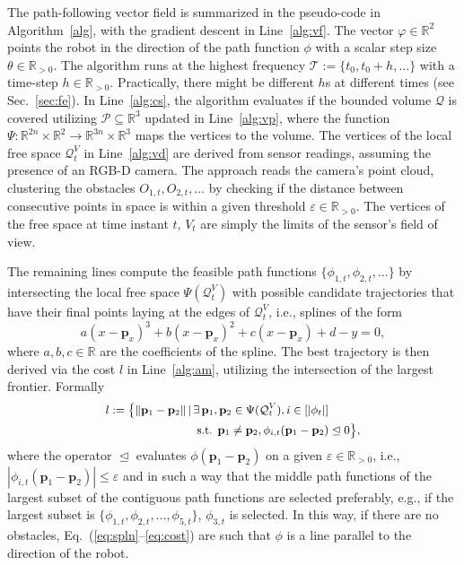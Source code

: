 \documentclass[letterpaper,10pt,conference,twoside]{IEEEtran}
\theoremstyle{definition}
\begin{document}
The path-following vector field is summarized in the pseudo-code in Algorithm~\ref{alg}, with the gradient descent in Line~\ref{alg:vf}. The vector $\varphi\in\mathbb{R}^2$ points the robot in the direction of the path function $\phi$ with a scalar step size $\theta\in\mathbb{R}_{>0}$. The algorithm runs at the highest frequency $\mathcal{T}:=\{t_0,t_0+h,\dots\}$ with a time-step $h\in\mathbb{R}_{>0}$. Practically, there might be different $h$s at different times (see Sec.~\ref{sec:fe}). In Line~\ref{alg:cs}, the algorithm evaluates if the bounded volume $\mathcal{Q}$ is covered utilizing $\mathcal{P}\subseteq\mathbb{R}^3$ updated in Line~\ref{alg:vp}, where the function $\Psi:\mathbb{R}^{2n}\times\mathbb{R}^2\rightarrow\mathbb{R}^{3n}\times\mathbb{R}^3$ maps the vertices to the volume. The vertices of the local free space $\mathcal{Q}^V_t$ in Line~\ref{alg:vd} are derived from sensor readings, assuming the presence of an RGB-D camera. The %
approach reads the camera's point cloud, clustering the obstacles $O_{1,t},O_{2,t},\dots$ by checking if the distance between consecutive points in space is within a given threshold $\varepsilon\in\mathbb{R}_{>0}$. The vertices of the free space at time instant $t$, $V_t$ are simply the limits of the sensor's field of view.

The remaining lines %
compute the feasible path functions $\{\phi_{1,t},\phi_{2,t},\dots\}$ by intersecting the local free space $\Psi(\mathcal{Q}^V_t)$ with possible candidate trajectories that have their final points laying at the edges of $\mathcal{Q}^V_t$, i.e., splines of the form
\begin{equation}\label{eq:spln}
  a(x-\mathbf{p}_x)^3+b(x-\mathbf{p}_x)^2+c(x-\mathbf{p}_x)+d-y=0,
\end{equation}
where $a,b,c\in\mathbb{R}$ are the coefficients of the spline. 
The best trajectory is then derived via the cost $l$ in Line~\ref{alg:am}, utilizing the intersection of the largest frontier. Formally
\begin{equation}\label{eq:cost}\small\begin{split} 
  l:=\bigl\{\lVert \mathbf{p}_1-\mathbf{p}_2\rVert\,|\,&\exists\,\mathbf{p}_1,\mathbf{p}_2\in\Psi(\mathcal{Q}_t^V),i\in[|\phi_t|]\\
  &\text{ s.t. }\mathbf{p}_1\neq\mathbf{p}_2,\phi_{i,t}(\mathbf{p}_1-\mathbf{p}_2)\trianglelefteq 0\bigr\},
\end{split}\end{equation}
where the operator $\trianglelefteq$ evaluates $\phi(\mathbf{p}_1-\mathbf{p}_2)$ on a given $\varepsilon\in\mathbb{R}_{>0}$, i.e., $|\phi_{i,t}(\mathbf{p}_1-\mathbf{p}_2)|\leq\varepsilon$ and in such a way that the middle path functions of the largest subset of the contiguous path functions are selected preferably, e.g., if the largest subset is $\{\phi_{1,t},\phi_{2,t},\dots,\phi_{5,t}\}$, $\phi_{3,t}$ is selected.
In this way, if there are no obstacles, Eq.~(\ref{eq:spln}--\ref{eq:cost}) are such that $\phi$ is a line parallel to the direction of the robot. 
\end{document}
